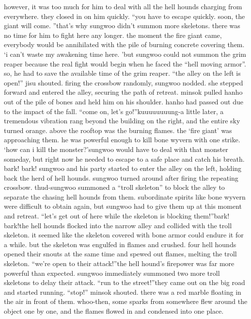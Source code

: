  however, it was too much for him to deal with all the hell hounds charging from everywhere.
they closed in on him quickly.
“you have to escape quickly.
 soon, the giant will come.
”that’s why sungwoo didn’t summon more skeletons.
 there was no time for him to fight here any longer.
 the moment the fire giant came, everybody would be annihilated with the pile of burning concrete covering them.
‘i can’t waste my awakening time here.
’but sungwoo could not summon the grim reaper because the real fight would begin when he faced the “hell moving armor”.
 so, he had to save the available time of the grim reaper.
“the alley on the left is open!” jisu shouted.
firing the crossbow randomly, sungwoo nodded.
 she stepped forward and entered the alley, securing the path of retreat.
 minsok pulled hanho out of the pile of bones and held him on his shoulder.
 hanho had passed out due to the impact of the fall.
“come on, let’s go!”kuuuuuuuung-a little later, a tremendous vibration rang beyond the building on the right, and the entire sky turned orange.
 above the rooftop was the burning flames.
the ‘fire giant’ was approaching them.
 he was powerful enough to kill bone wyvern with one strike.
‘how can i kill the monster?’sungwoo would have to deal with that monster someday, but right now he needed to escape to a safe place and catch his breath.
bark! bark!
sungwoo and his party started to enter the alley on the left, holding back the herd of hell hounds.
 sungwoo turned around after firing the repeating crossbow.
thud-sungwoo summoned a “troll skeleton” to block the alley to separate the chasing hell hounds from them.
subordinate spirits like bone wyvern were difficult to obtain again, but sungwoo had to give them up at this moment and retreat.
“let’s get out of here while the skeleton is blocking them!”bark! bark!the hell hounds flocked into the narrow alley and collided with the troll skeleton.
 it seemed like the skeleton covered with bone armor could endure it for a while.
but the skeleton was engulfed in flames and crushed.
 four hell hounds opened their snouts at the same time and spewed out flames, melting the troll skeleton.
“we’re open to their attack!”the hell hound’s firepower was far more powerful than expected.
 sungwoo immediately summoned two more troll skeletons to delay their attack.
“run to the street!”they came out on the big road and started running.
“stop!” minsok shouted.
 there was a red marble floating in the air in front of them.
whoo-then, some sparks from somewhere flew around the object one by one, and the flames flowed in and condensed into one place.
